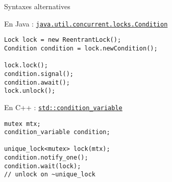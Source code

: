 
\begingroup

\begin{frame}[fragile]{Syntaxes alternatives}
  \begin{block}{En Java : \href{https://docs.oracle.com/javase/7/docs/api/java/util/concurrent/locks/Condition.html}{\lstinline{java.util.concurrent.locks.Condition}}}
\begin{lstlisting}
Lock lock = new ReentrantLock();
Condition condition = lock.newCondition(); 

lock.lock();
condition.signal();
condition.await();
lock.unlock();
\end{lstlisting}
\end{block}
  \begin{block}{En C++ : \href{http://www.cplusplus.com/reference/condition_variable/condition_variable/}{\lstinline{std::condition_variable}}}
\begin{lstlisting}
mutex mtx;
condition_variable condition;

unique_lock<mutex> lock(mtx);
condition.notify_one();
condition.wait(lock);
// unlock on ~unique_lock
\end{lstlisting}
\end{block}
\end{frame}

\endgroup
\endinput
